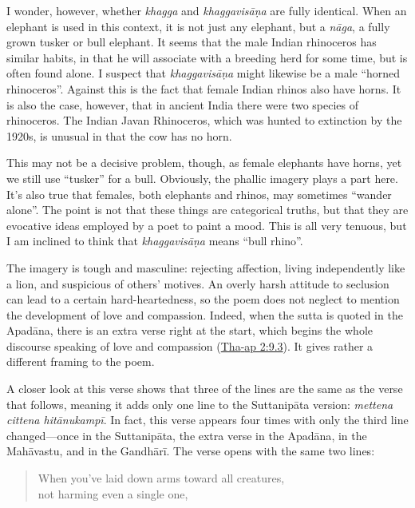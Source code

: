 \documentclass[12pt,openany]{book}%
\begin{document}
I wonder, however, whether \textit{khagga} and \textit{\textsanskrit{khaggavisāṇa}} are fully identical. When an elephant is used in this context, it is not just any elephant, but a \textit{\textsanskrit{nāga}}, a fully grown tusker or bull elephant. It seems that the male Indian rhinoceros has similar habits, in that he will associate with a breeding herd for some time, but is often found alone. I suspect that \textit{\textsanskrit{khaggavisāṇa}} might likewise be a male “horned rhinoceros”. Against this is the fact that female Indian rhinos also have horns. It is also the case, however, that in ancient India there were two species of rhinoceros. The Indian Javan Rhinoceros, which was hunted to extinction by the 1920s, is unusual in that the cow has no horn.

This may not be a decisive problem, though, as female elephants have horns, yet we still use “tusker” for a bull. Obviously, the phallic imagery plays a part here. It’s also true that females, both elephants and rhinos, may sometimes “wander alone”. The point is not that these things are categorical truths, but that they are evocative ideas employed by a poet to paint a mood. This is all very tenuous, but I am inclined to think that \textit{\textsanskrit{khaggavisāṇa}} means “bull rhino”.

The imagery is tough and masculine: rejecting affection, living independently like a lion, and suspicious of others’ motives. An overly harsh attitude to seclusion can lead to a certain hard-heartedness, so the poem does not neglect to mention the development of love and compassion. Indeed, when the sutta is quoted in the \textsanskrit{Apadāna}, there is an extra verse right at the start, which begins the whole discourse speaking of love and compassion (\href{https://suttacentral.net/tha{-}ap2}{Tha{-}ap 2:9.3}). It gives rather a different framing to the poem.

A closer look at this verse shows that three of the lines are the same as the verse that follows, meaning it adds only one line to the \textsanskrit{Suttanipāta} version: \textit{mettena cittena \textsanskrit{hitānukampī}}. In fact, this verse appears four times with only the third line changed—once in the \textsanskrit{Suttanipāta}, the extra verse in the \textsanskrit{Apadāna}, in the \textsanskrit{Mahāvastu}, and in the \textsanskrit{Gandhārī}. The verse opens with the same two lines:

\begin{verse}%
When you’ve laid down arms toward all creatures, \\
not harming even a single one,

%
\end{verse}
\end{document}
